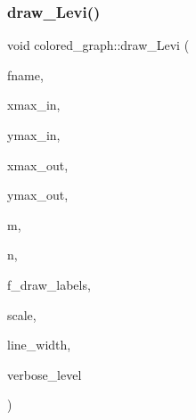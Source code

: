 \mbox{\label{classcolored__graph_a5c5ee5bee29d724887a32f6f43ca24ff}} 
\subsubsection{\texorpdfstring{draw\+\_\+\+Levi()}{draw\_Levi()}}
{\footnotesize\ttfamily void colored\+\_\+graph\+::draw\+\_\+\+Levi (\begin{DoxyParamCaption}\item[{const \mbox{\hyperlink{galois_8h_ab6cc7b4aeb6ea31aba2b3fbfc83ff5e6}{B\+Y\+TE}} $\ast$}]{fname,  }\item[{\mbox{\hyperlink{galois_8h_a09fddde158a3a20bd2dcadb609de11dc}{I\+NT}}}]{xmax\+\_\+in,  }\item[{\mbox{\hyperlink{galois_8h_a09fddde158a3a20bd2dcadb609de11dc}{I\+NT}}}]{ymax\+\_\+in,  }\item[{\mbox{\hyperlink{galois_8h_a09fddde158a3a20bd2dcadb609de11dc}{I\+NT}}}]{xmax\+\_\+out,  }\item[{\mbox{\hyperlink{galois_8h_a09fddde158a3a20bd2dcadb609de11dc}{I\+NT}}}]{ymax\+\_\+out,  }\item[{\mbox{\hyperlink{galois_8h_a09fddde158a3a20bd2dcadb609de11dc}{I\+NT}}}]{m,  }\item[{\mbox{\hyperlink{galois_8h_a09fddde158a3a20bd2dcadb609de11dc}{I\+NT}}}]{n,  }\item[{\mbox{\hyperlink{galois_8h_a09fddde158a3a20bd2dcadb609de11dc}{I\+NT}}}]{f\+\_\+draw\+\_\+labels,  }\item[{double}]{scale,  }\item[{double}]{line\+\_\+width,  }\item[{\mbox{\hyperlink{galois_8h_a09fddde158a3a20bd2dcadb609de11dc}{I\+NT}}}]{verbose\+\_\+level }\end{DoxyParamCaption})}

\mbox{\label{classcolored__graph_a1d55e0555a9def288aad59156b1e64db}} 
